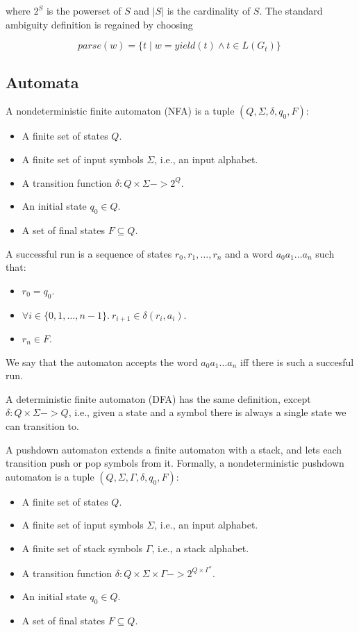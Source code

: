 \documentclass[acmsmall,review,anonymous]{acmart}\settopmatter{printfolios=true,printccs=false,printacmref=false}
\newcommand{\yield}{\mathit{yield}} %
\newcommand{\parse}{\mathit{parse}} %
\begin{document}
\noindent where $2^S$ is the powerset of $S$ and $|S|$ is the cardinality of $S$. The standard ambiguity definition is regained by choosing

\[ \parse(w) = \{ t \mid w = \yield(t) \land t \in L(G_t) \}\ \]

\subsection{Automata}

A nondeterministic finite automaton (NFA) is a tuple $(Q, \Sigma, \delta, q_0, F)$:

\begin{itemize}
\item A finite set of states $Q$.
\item A finite set of input symbols $\Sigma$, i.e., an input alphabet.
\item A transition function $\delta: Q \times \Sigma -> 2^Q$.
\item An initial state $q_0 \in Q$.
\item A set of final states $F \subseteq Q$.
\end{itemize}

\noindent A successful run is a sequence of states $r_0, r_1, \ldots, r_n$ and a word $a_0a_1\ldots a_n$ such that:

\begin{itemize}
\item $r_0 = q_0$.
\item $\forall i \in \{0, 1, \ldots, n-1\}.\ r_{i+1} \in \delta(r_i, a_i)$.
\item $r_n \in F$.
\end{itemize}

\noindent We say that the automaton accepts the word $a_0a_1\ldots a_n$ iff there is such a succesful run.

A deterministic finite automaton (DFA) has the same definition, except $\delta : Q \times \Sigma -> Q$, i.e., given a state and a symbol there is always a single state we can transition to.

A pushdown automaton extends a finite automaton with a stack, and lets each transition push or pop symbols from it. Formally, a nondeterministic pushdown automaton is a tuple $(Q, \Sigma, \Gamma, \delta, q_0, F)$:

\begin{itemize}
\item A finite set of states $Q$.
\item A finite set of input symbols $\Sigma$, i.e., an input alphabet.
\item A finite set of stack symbols $\Gamma$, i.e., a stack alphabet.
\item A transition function $\delta: Q \times \Sigma \times \Gamma -> 2^{Q \times \Gamma^{*}}$.
\item An initial state $q_0 \in Q$.
\item A set of final states $F \subseteq Q$.
\end{itemize}
\end{document}
